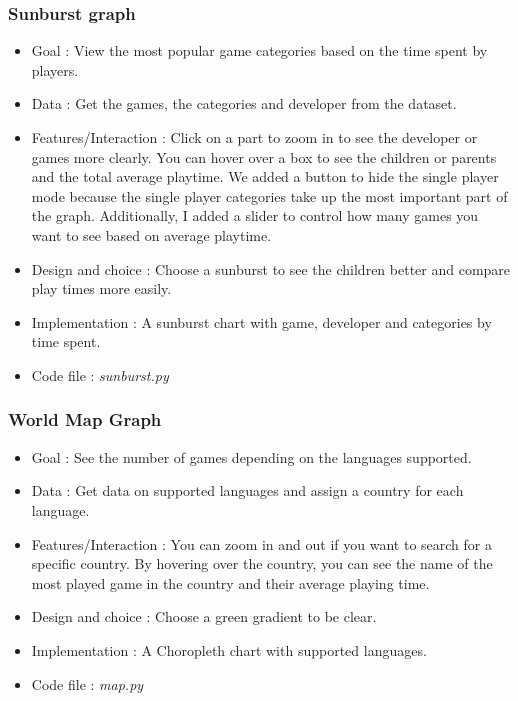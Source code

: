 \documentclass{article}
\begin{document}
    \subsubsection{Sunburst graph}
    \begin{itemize}
        \item Goal : View the most popular game categories based on the time spent by players.
        \item Data : Get the games, the categories and developer from the dataset.
        \item Features/Interaction : Click on a part to zoom in to see the developer or games more clearly. You can hover over a box to see the children or parents and the total average playtime. We added a button to hide the single player mode because the single player categories take up the most important part of the graph. Additionally, I added a slider to control how many games you want to see based on average playtime.
        \item Design and choice : Choose a sunburst to see the children better and compare play times more easily.
        \item Implementation : A sunburst chart with game, developer and categories by time spent.
        \item Code file : \textit{sunburst.py}
    \end{itemize}
    
    \subsubsection{World Map Graph}
    \begin{itemize}
        \item Goal : See the number of games depending on the languages supported.
        \item Data : Get data on supported languages and assign a country for each language.
        \item Features/Interaction : You can zoom in and out if you want to search for a specific country. By hovering over the country, you can see the name of the most played game in the country and their average playing time.
        \item Design and choice : Choose a green gradient to be clear.
        \item Implementation : A Choropleth chart with supported languages.
        \item Code file : \textit{map.py}
    \end{itemize}
    
\end{document}
